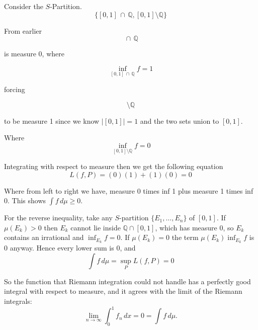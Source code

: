 \documentclass[12pt]{article}
\theoremstyle{plain}
\theoremstyle{definition}
\theoremstyle{definition}
\theoremstyle{remark}
\begin{document}
Consider the $S$-Partition.
\begin{equation*}
    \{[0, 1]\, \cap \, \mathbb{Q}, [0, 1] \setminus \mathbb{Q}\}
\end{equation*}

From earlier 
\begin{equation*}
    [0, 1]\, \cap \, \mathbb{Q}
\end{equation*}

is measure 0, where

\begin{equation*}
    \inf_{[0, 1]\, \cap \, \mathbb{Q}} f = 1
\end{equation*}

forcing

\begin{equation*}
    [0, 1] \setminus \mathbb{Q}
\end{equation*}

to be measure 1 since we know $|[0, 1]| = 1$ and the two sets
union to $[0, 1]$.

Where
\begin{equation*}
    \inf_{[0, 1] \setminus \mathbb{Q}} f = 0
\end{equation*}

Integrating with respect to measure then we get the following equation
\begin{equation}
    L(f, P) = (0)(1) + (1)(0) = 0
\end{equation}

Where from left to right we have, measure 0 times inf 1 plus
measure 1 times inf 0. This shows $\int f \, d\mu \geq 0$.

For the reverse inequality, take any $S$-partition $\{E_1, \ldots, E_n\}$ of $[0, 1]$.
If $\mu(E_k) > 0$ then $E_k$ cannot lie inside $\mathbb{Q} \cap [0, 1]$, which has measure 0,
so $E_k$ contains an irrational and $\inf_{E_k} f = 0$. If $\mu(E_k) = 0$ the term
$\mu(E_k) \inf_{E_k} f$ is $0$ anyway. Hence every lower sum is $0$, and
\begin{equation}
    \int f \, d\mu = \sup_P L(f, P) = 0
\end{equation}

So the function that Riemann integration could not handle has a perfectly good integral
with respect to measure, and it agrees with the limit of the Riemann integrals:
\begin{equation*}
    \lim_{n \to \infty} \int_0^1 f_n \, dx = 0 = \int f \, d\mu.
\end{equation*}
\end{document}
